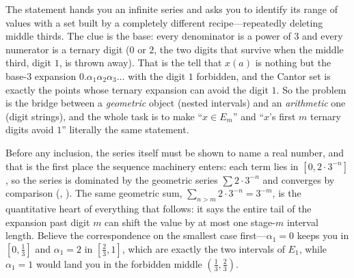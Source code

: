 \documentclass[main.tex]{subfiles}
\begin{document}
\begin{Reflection}
The statement hands you an infinite series and asks you to identify its range of values with a set built
by a completely different recipe---repeatedly deleting middle thirds. The clue is the base: every
denominator is a power of $3$ and every numerator is a ternary digit ($0$ or $2$, the two digits that
survive when the middle third, digit $1$, is thrown away). That is the tell that $x(a)$ is nothing but
the base-$3$ expansion $0.\alpha_{1}\alpha_{2}\alpha_{3}\dots$ with the digit $1$ forbidden, and the
Cantor set is exactly the points whose ternary expansion can avoid the digit $1$. So the problem is the
bridge between a \emph{geometric} object (nested intervals) and an \emph{arithmetic} one (digit strings),
and the whole task is to make ``$x\in E_{m}$'' and ``$x$'s first $m$ ternary digits avoid $1$'' literally
the same statement.

Before any inclusion, the series itself must be shown to name a real number, and that is the first place
the sequence machinery enters: each term lies in $[0,2\cdot 3^{-n}]$, so the series is dominated by the
geometric series $\sum 2\cdot 3^{-n}$ and converges by comparison (, ). The
same geometric sum, $\sum_{n>m}2\cdot 3^{-n}=3^{-m}$, is the quantitative heart of everything that
follows: it says the entire tail of the expansion past digit $m$ can shift the value by at most one
stage-$m$ interval length. Believe the correspondence on the smallest case first---$\alpha_{1}=0$ keeps
you in $[0,\tfrac13]$ and $\alpha_{1}=2$ in $[\tfrac23,1]$, which are exactly the two intervals of
$E_{1}$, while $\alpha_{1}=1$ would land you in the forbidden middle $(\tfrac13,\tfrac23)$.


\end{Reflection}
\end{document}
